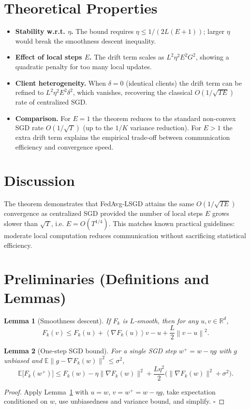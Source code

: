 \documentclass{article}
\newtheorem{lemma}{Lemma}
\newcommand{\E}{\mathbb{E}}
\newcommand{\norm}[1]{\left\|#1\right\|}
\newcommand{\inner}[1]{\left\langle#1\right\rangle}
\begin{document}
\section*{Theoretical Properties}
\begin{itemize}
    \item \textbf{Stability w.r.t. $\eta$.} The bound requires $\eta\le 1/(2L(E+1))$; larger $\eta$ would break the smoothness descent inequality.
    \item \textbf{Effect of local steps $E$.} The drift term scales as $L^{2}\eta^{2}E^{2}G^{2}$, showing a quadratic penalty for too many local updates.
    \item \textbf{Client heterogeneity.} When $\delta=0$ (identical clients) the drift term can be refined to $L^{2}\eta^{2}E^{2}\delta^{2}$, which vanishes, recovering the classical $O(1/\sqrt{TE})$ rate of centralized SGD.
    \item \textbf{Comparison.} For $E=1$ the theorem reduces to the standard non‑convex SGD rate $O(1/\sqrt{T})$ (up to the $1/K$ variance reduction). For $E>1$ the extra drift term explains the empirical trade‑off between communication efficiency and convergence speed.
\end{itemize}

\section*{Discussion}
The theorem demonstrates that FedAvg‑LSGD attains the same $O(1/\sqrt{TE})$ convergence as centralized SGD provided the number of local steps $E$ grows slower than $\sqrt{T}$, i.e. $E=O(T^{1/4})$. This matches known practical guidelines: moderate local computation reduces communication without sacrificing statistical efficiency.

\newpage
\section*{Preliminaries (Definitions and Lemmas)}
\begin{lemma}[Smoothness descent]\label{lem:smooth}
If $F_k$ is $L$‑smooth, then for any $u,v\in\mathbb{R}^{d}$,
\[
F_k(v)\le F_k(u)+\inner{\nabla F_k(u)}{v-u}+\frac{L}{2}\norm{v-u}^{2}.
\] 
\end{lemma}
\begin{lemma}[One‑step SGD bound]\label{lem:sgd}
For a single SGD step $w^{+}=w-\eta g$ with $g$ unbiased and $\E\|g-\nabla F_k(w)\|^{2}\le\sigma^{2}$,
\[
\E\big[F_k(w^{+})\big]\le F_k(w)-\eta\|\nabla F_k(w)\|^{2}
+\frac{L\eta^{2}}{2}\big(\|\nabla F_k(w)\|^{2}+\sigma^{2}\big).
\] 
\end{lemma}
\begin{proof}
Apply Lemma~\ref{lem:smooth} with $u=w$, $v=w^{+}=w-\eta g$,
take expectation conditioned on $w$, use unbiasedness and variance bound, and simplify. \hfill $\square$
\end{proof}
\end{document}
